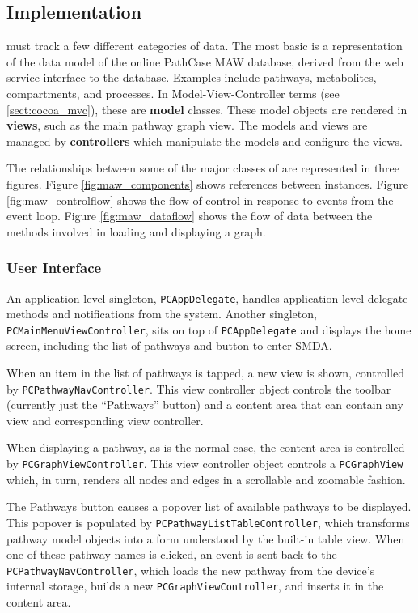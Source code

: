 \subsection{Implementation}
\label{sect:maw_implementation}

\mawapp must track a few different categories of data. The most basic is a
representation of the data model of the online PathCase MAW database, derived
from the web service interface to the database. Examples include pathways,
metabolites, compartments, and processes. In Model-View-Controller terms (see
\ref{sect:cocoa_mvc}), these are \textbf{model} classes.  These model
objects are rendered in \textbf{views}, such as the main pathway graph view.
The models and views are managed by \textbf{controllers} which manipulate the
models and configure the views.

The relationships between some of the major classes of \mawapp are represented
in three figures. Figure \ref{fig:maw_components} shows references between
instances. Figure \ref{fig:maw_controlflow} shows the flow of control in
response to events from the event loop. Figure \ref{fig:maw_dataflow} shows the
flow of data between the methods involved in loading and displaying a graph.

\subsubsection{User Interface}
\label{sect:maw_ui}

An application-level singleton, \texttt{PCAppDelegate}, handles
application-level delegate methods and notifications from the system. Another
singleton, \texttt{PCMainMenuViewController}, sits on top of
\texttt{PCAppDelegate} and displays the home screen, including the list of
pathways and button to enter SMDA.

When an item in the list of pathways is tapped, a new view is shown, controlled
by \texttt{PCPathwayNavController}. This view controller object controls the
toolbar (currently just the ``Pathways'' button) and a content area that can
contain any view and corresponding view controller.

When displaying a pathway, as is the normal case, the content area is controlled
by \texttt{PCGraphViewController}. This view controller object controls a
\texttt{PCGraphView} which, in turn, renders all nodes and edges in a scrollable
and zoomable fashion.

The Pathways button causes a popover list of available pathways to be displayed.
This popover is populated by \texttt{PCPathwayListTableController}, which
transforms pathway model objects into a form understood by the built-in table
view. When one of these pathway names is clicked, an event is sent back to the
\texttt{PCPathwayNavController}, which loads the new pathway from the device's
internal storage, builds a new \texttt{PCGraphViewController}, and inserts it in
the content area.

